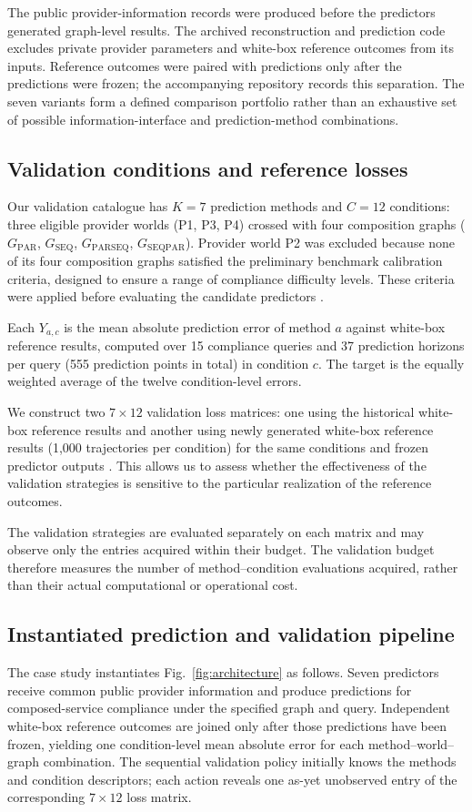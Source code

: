 \documentclass[10pt,a4paper]{article}
\begin{document}
The public provider-information records were produced before the predictors generated graph-level results. The archived reconstruction and prediction code excludes private provider parameters and white-box reference outcomes from its inputs. Reference outcomes were paired with predictions only after the predictions were frozen; the accompanying repository records this separation. The seven variants form a defined comparison portfolio rather than an exhaustive set of possible information-interface and prediction-method combinations.


\subsection{Validation conditions and reference losses}
Our validation catalogue has $K=7$ prediction methods
and $C=12$ conditions: three eligible provider worlds
(P1, P3, P4) crossed with four composition graphs
($G_{\mathrm{PAR}}$, $G_{\mathrm{SEQ}}$,
$G_{\mathrm{PARSEQ}}$, $G_{\mathrm{SEQPAR}}$). Provider world P2 was excluded because none of its four
composition graphs satisfied the preliminary benchmark
calibration criteria, designed to ensure a range of
compliance difficulty levels. These criteria were applied
before evaluating the candidate predictors
\cite{praiseB1Report}.

Each $Y_{a,c}$ is the mean absolute prediction error
of method $a$ against white-box reference results,
computed over 15 compliance queries and 37 prediction
horizons per query (555 prediction points in total)
in condition $c$. The target is the equally weighted average of the
twelve condition-level errors.

We construct two $7\times12$ validation loss matrices:
one using the historical white-box reference results
\cite{praiseB1Report} and another using newly generated
white-box reference results (1,000 trajectories per
condition) for the same conditions and frozen predictor
outputs \cite{praiseB0001}. This allows us to assess whether the effectiveness of the validation strategies is sensitive to the
particular realization of the reference outcomes.

The validation strategies are evaluated separately
on each matrix and may observe only the entries
acquired within their budget. The validation budget therefore measures the number of method--condition evaluations acquired, rather than their actual computational or operational cost.

\subsection{Instantiated prediction and validation pipeline}
The case study instantiates Fig.~\ref{fig:architecture} as follows. Seven predictors receive common public provider information and produce predictions for composed-service compliance under the specified graph and query. Independent white-box reference outcomes are joined only after those predictions have been frozen, yielding one condition-level mean absolute error for each method--world--graph combination. The sequential validation policy initially knows the methods and condition descriptors; each action reveals one as-yet unobserved entry of the corresponding $7\times12$ loss matrix.
\end{document}
